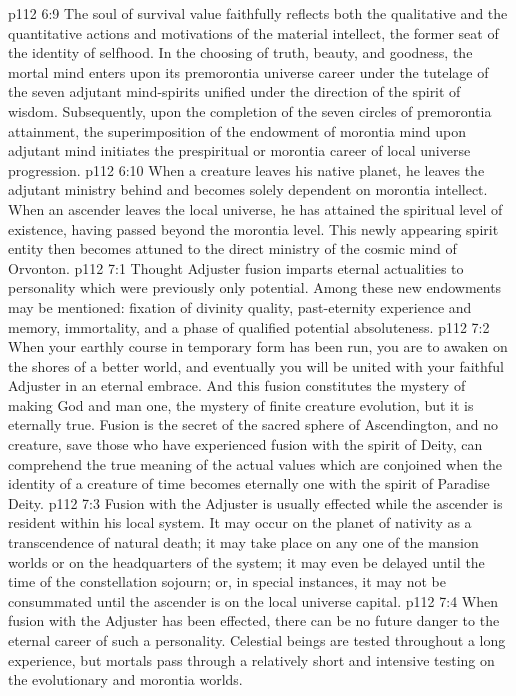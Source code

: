 \vs p112 6:9 The soul of survival value faithfully reflects both the qualitative and the quantitative actions and motivations of the material intellect, the former seat of the identity of selfhood. In the choosing of truth, beauty, and goodness, the mortal mind enters upon its premorontia universe career under the tutelage of the seven adjutant mind\hyp{}spirits unified under the direction of the spirit of wisdom. Subsequently, upon the completion of the seven circles of premorontia attainment, the superimposition of the endowment of morontia mind upon adjutant mind initiates the prespiritual or morontia career of local universe progression.
\pc \vs p112 6:10 When a creature leaves his native planet, he leaves the adjutant ministry behind and becomes solely dependent on morontia intellect. When an ascender leaves the local universe, he has attained the spiritual level of existence, having passed beyond the morontia level. This newly appearing spirit entity then becomes attuned to the direct ministry of the cosmic mind of Orvonton.
\vs p112 7:1 Thought Adjuster fusion imparts eternal actualities to personality which were previously only potential. Among these new endowments may be mentioned: fixation of divinity quality, past\hyp{}eternity experience and memory, immortality, and a phase of qualified potential absoluteness.
\pc \vs p112 7:2 When your earthly course in temporary form has been run, you are to awaken on the shores of a better world, and eventually you will be united with your faithful Adjuster in an eternal embrace. And this fusion constitutes the mystery of making God and man one, the mystery of finite creature evolution, but it is eternally true. Fusion is the secret of the sacred sphere of Ascendington, and no creature, save those who have experienced fusion with the spirit of Deity, can comprehend the true meaning of the actual values which are conjoined when the identity of a creature of time becomes eternally one with the spirit of Paradise Deity.
\vs p112 7:3 Fusion with the Adjuster is usually effected while the ascender is resident within his local system. It may occur on the planet of nativity as a transcendence of natural death; it may take place on any one of the mansion worlds or on the headquarters of the system; it may even be delayed until the time of the constellation sojourn; or, in special instances, it may not be consummated until the ascender is on the local universe capital.
\vs p112 7:4 When fusion with the Adjuster has been effected, there can be no future danger to the eternal career of such a personality. Celestial beings are tested throughout a long experience, but mortals pass through a relatively short and intensive testing on the evolutionary and morontia worlds.
